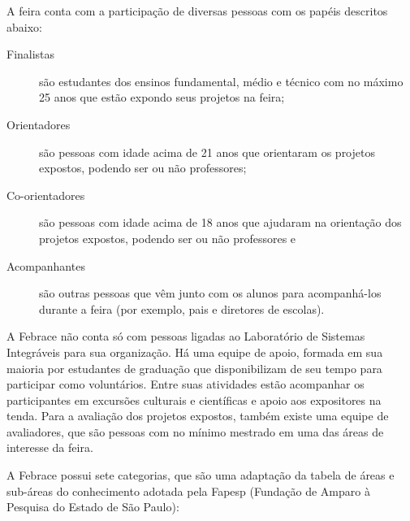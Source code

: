 A feira conta com a participação de diversas pessoas com os papéis descritos abaixo:

\begin{description}
    \item[Finalistas] 
        são estudantes dos ensinos fundamental, médio e técnico com no máximo 25 anos que estão expondo seus projetos na feira;
    \item[Orientadores] 
        são pessoas com idade acima de 21 anos que orientaram os projetos expostos, podendo ser ou não professores;
    \item[Co-orientadores] 
        são pessoas com idade acima de 18 anos que ajudaram na orientação dos projetos expostos, podendo ser ou não professores e
    \item[Acompanhantes] 
        são outras pessoas que vêm junto com os alunos para acompanhá-los durante a feira (por exemplo, pais e diretores de escolas).
\end{description}

A Febrace não conta só com pessoas ligadas ao Laboratório de Sistemas Integráveis para sua organização. Há uma equipe de apoio, formada em sua maioria por estudantes de graduação que disponibilizam de seu tempo para participar como voluntários. Entre suas atividades estão acompanhar os participantes em excursões culturais e científicas e apoio aos expositores na tenda. Para a avaliação dos projetos expostos, também existe uma equipe de avaliadores, que são pessoas com no mínimo mestrado em uma das áreas de interesse da feira.

A Febrace possui sete categorias, que são uma adaptação da tabela de áreas e sub-áreas do conhecimento adotada pela Fapesp (Fundação de Amparo à Pesquisa do Estado de São Paulo):

